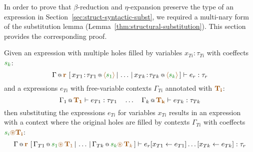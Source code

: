 In order to prove that $\beta$-reduction and $\eta$-expansion preserve the type of an expression
in Section~\ref{sec:struct-syntactic-subst}, we required a multi-nary form of the substitution 
lemma (Lemma~\ref{thm:structural-substitution}). This section provides the corresponding proof.

\begin{lemma*}
Given an expression with multiple holes filled by variables $x_{Ti}\!:\!\tau_{Ti}$ with coeffects $\cclrd{s_k}$:
%
\begin{equation*}
\coctx{\Gamma}{\aclrd{\textbf{r}}}~[\,\coctx{x_{T1}\!:\!\tau_{T1}}{\alift{\cclrd{s_1}}} \,|\, \ldots \,|\,
  \coctx{x_{Tk}\!:\!\tau_{Tk}}{\alift{\cclrd{s_k}}}\,] \vdash e_r : \tau_r
\end{equation*}
%
and a expressions $e_{Ti}$ with free-variable contexts $\Gamma_{Ti}$ annotated with $\aclrd{\mathbf{T_i}}$:
%
\begin{equation*}
\coctx{\Gamma_1}{\aclrd{\mathbf{T_1}}} \vdash e_{T1} : \tau_{T1}
\quad \ldots \quad
\coctx{\Gamma_k}{\aclrd{\mathbf{T_k}}} \vdash e_{Tk} : \tau_{Tk}
\end{equation*}
%
then substituting the expressions $e_{Ti}$ for variables $x_{Ti}$ results in an expression with a context
where the original holes are filled by contexts $\Gamma_{Ti}$ with coeffects $\cclrd{s_i} \aseq \aclrd{\mathbf{T_i}}$:
%
\begin{equation*}
\coctx{\Gamma}{\aclrd{\textbf{r}}}~[\,\coctx{\Gamma_{T1}}{\cclrd{s_1}\aseq\,\aclrd{\textbf{T}_1}} \,|\, \ldots \,|\, 
  \coctx{\Gamma_{Tk}}{\cclrd{s_k}\aseq\,\aclrd{\textbf{T}_k}}\,] \vdash \subst{\subst{e_r}{x_{T1}}{e_{T1}}\ldots}{x_{Tk}}{e_{Tk}} : \tau_r
\end{equation*}
\end{lemma*}
